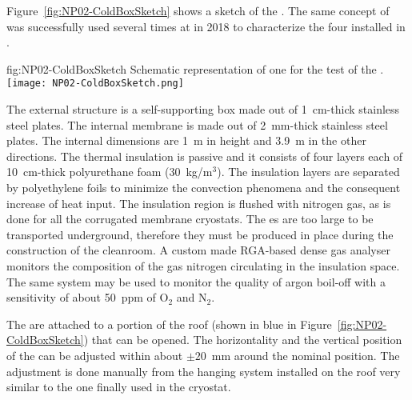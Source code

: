 Figure~\ref{fig:NP02-ColdBoxSketch} shows a sketch of the  \coldbox.
The same concept of  \coldbox was successfully used several times at  in 2018 to characterize the four  installed in .
\begin{dunefigure}{fig:NP02-ColdBoxSketch}
{Schematic representation of one \coldbox for the test of the .}
\texttt{[image: NP02-ColdBoxSketch.png]}
\end{dunefigure}
The external structure is a self-supporting box made out of 1~cm-thick stainless steel plates.
The internal membrane is made out of 2~mm-thick stainless steel plates.
The internal dimensions are 1~m in height and 3.9~m in the other directions.
The thermal insulation is passive and it consists of four layers each of 10~cm-thick polyurethane foam (30~kg/m$^3$).
The insulation layers are separated by polyethylene foils to minimize the convection phenomena and the consequent increase of heat input.
The insulation region is flushed with  nitrogen gas, as is done for all the corrugated membrane cryostats.
The  \coldbox{}es are too large to be transported underground, therefore they must be produced in place during the construction of the cleanroom.
A custom made RGA-based dense gas analyser monitors the composition of the gas nitrogen circulating in the insulation space.
The same system may be used to monitor the quality of argon boil-off with a sensitivity of about 50~ppm of O$_2$ and N$_2$.

The  are attached to a portion of the roof (shown in blue in Figure~\ref{fig:NP02-ColdBoxSketch}) that can be opened.
The horizontality and the vertical position of the  can be adjusted within about $\pm 20$~mm around the nominal position.
The adjustment is done manually from the hanging system installed on the  \coldbox roof very similar to the one finally used in the cryostat.

